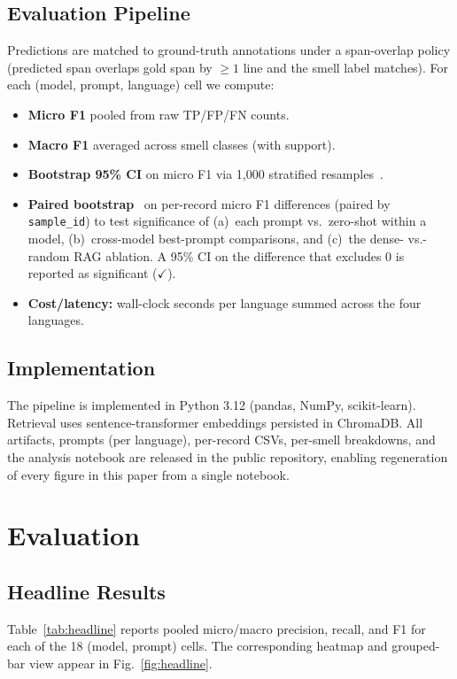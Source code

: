 \documentclass[conference]{IEEEtran}
\begin{document}
\subsection{Evaluation Pipeline}
Predictions are matched to ground-truth annotations under a span-overlap policy
(predicted span overlaps gold span by $\ge 1$ line and the smell label matches).
For each (model, prompt, language) cell we compute:
\begin{itemize}
 \item \textbf{Micro F1} pooled from raw TP/FP/FN counts.
 \item \textbf{Macro F1} averaged across smell classes (with support).
 \item \textbf{Bootstrap 95\% CI} on micro F1 via 1{,}000 stratified
 resamples~\cite{efron1993bootstrap}.
 \item \textbf{Paired bootstrap}~\cite{efron1993bootstrap} on per-record
 micro F1 differences (paired by
 \texttt{sample\_id}) to test significance of (a)~each prompt vs.~zero-shot
 within a model, (b)~cross-model best-prompt comparisons, and (c)~the dense-
 vs.-random RAG ablation. A 95\% CI on the difference that excludes 0 is
 reported as significant ($\checkmark$).
 \item \textbf{Cost/latency:} wall-clock seconds per language summed across
 the four languages.
\end{itemize}

\subsection{Implementation}
The pipeline is implemented in Python 3.12 (pandas, NumPy, scikit-learn).
Retrieval uses sentence-transformer embeddings persisted in ChromaDB. All
artifacts, prompts (per language), per-record CSVs, per-smell breakdowns, and
the analysis notebook are released in the public repository, enabling
regeneration of every figure in this paper from a single notebook.

\section{Evaluation}

\subsection{Headline Results}
Table~\ref{tab:headline} reports pooled micro/macro precision, recall, and F1 for
each of the 18 (model, prompt) cells. The corresponding heatmap and grouped-bar
view appear in Fig.~\ref{fig:headline}.
\end{document}
